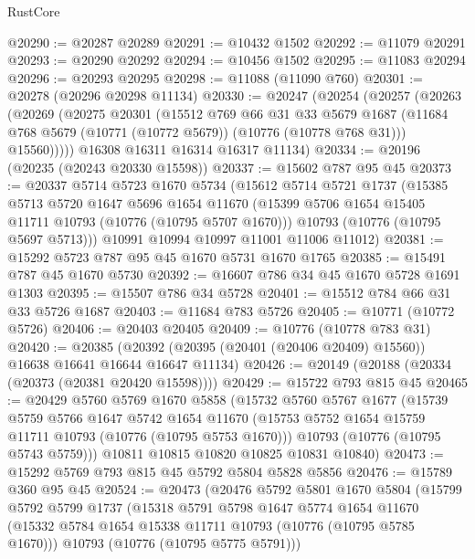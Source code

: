 \begin{lexlean}{RustCore}
\begin{coremodule}
@20290 := @20287 @20289
@20291 := @10432 @1502
@20292 := @11079 @20291
@20293 := @20290 @20292
@20294 := @10456 @1502
@20295 := @11083 @20294
@20296 := @20293 @20295
@20298 := @11088 (@11090 @760)
@20301 := @20278 (@20296 @20298 @11134)
@20330 := @20247
    (@20254
      (@20257
        (@20263
          (@20269
            (@20275
              @20301
              (@15512
                @769
                @66
                @31
                @33
                @5679
                @1687
                (@11684 @768 @5679 (@10771 (@10772 @5679)) (@10776 (@10778 @768 @31)))
                @15560)))))
      @16308
      @16311
      @16314
      @16317
      @11134)
@20334 := @20196 (@20235 (@20243 @20330 @15598))
@20337 := @15602 @787 @95 @45
@20373 := @20337
    @5714
    @5723
    @1670
    @5734
    (@15612
      @5714
      @5721
      @1737
      (@15385
        @5713
        @5720
        @1647
        @5696
        @1654
        @11670
        (@15399 @5706 @1654 @15405 @11711 @10793 (@10776 (@10795 @5707 @1670)))
        @10793
        (@10776 (@10795 @5697 @5713)))
      @10991
      @10994
      @10997
      @11001
      @11006
      @11012)
@20381 := @15292 @5723 @787 @95 @45 @1670 @5731 @1670 @1765
@20385 := @15491 @787 @45 @1670 @5730
@20392 := @16607 @786 @34 @45 @1670 @5728 @1691 @1303
@20395 := @15507 @786 @34 @5728
@20401 := @15512 @784 @66 @31 @33 @5726 @1687
@20403 := @11684 @783 @5726
@20405 := @10771 (@10772 @5726)
@20406 := @20403 @20405
@20409 := @10776 (@10778 @783 @31)
@20420 := @20385
    (@20392 (@20395 (@20401 (@20406 @20409) @15560)) @16638 @16641 @16644 @16647 @11134)
@20426 := @20149 (@20188 (@20334 (@20373 (@20381 @20420 @15598))))
@20429 := @15722 @793 @815 @45
@20465 := @20429
    @5760
    @5769
    @1670
    @5858
    (@15732
      @5760
      @5767
      @1677
      (@15739
        @5759
        @5766
        @1647
        @5742
        @1654
        @11670
        (@15753 @5752 @1654 @15759 @11711 @10793 (@10776 (@10795 @5753 @1670)))
        @10793
        (@10776 (@10795 @5743 @5759)))
      @10811
      @10815
      @10820
      @10825
      @10831
      @10840)
@20473 := @15292 @5769 @793 @815 @45 @5792 @5804 @5828 @5856
@20476 := @15789 @360 @95 @45
@20524 := @20473
    (@20476
      @5792
      @5801
      @1670
      @5804
      (@15799
        @5792
        @5799
        @1737
        (@15318
          @5791
          @5798
          @1647
          @5774
          @1654
          @11670
          (@15332 @5784 @1654 @15338 @11711 @10793 (@10776 (@10795 @5785 @1670)))
          @10793
          (@10776 (@10795 @5775 @5791)))

\end{coremodule}
\end{lexlean}
